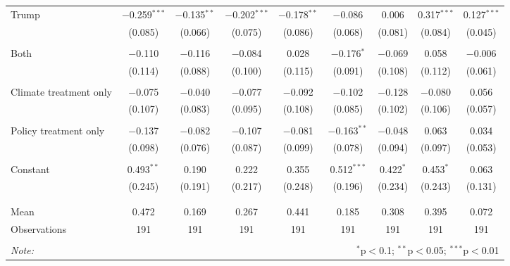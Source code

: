 \begin{tabular}{@{\extracolsep{5pt}}lcccccccc}
 Trump & $-$0.259$^{***}$ & $-$0.135$^{**}$ & $-$0.202$^{***}$ & $-$0.178$^{**}$ & $-$0.086 & 0.006 & 0.317$^{***}$ & 0.127$^{***}$ \\ 
  & (0.085) & (0.066) & (0.075) & (0.086) & (0.068) & (0.081) & (0.084) & (0.045) \\ 
  & & & & & & & & \\ 
 Both & $-$0.110 & $-$0.116 & $-$0.084 & 0.028 & $-$0.176$^{*}$ & $-$0.069 & 0.058 & $-$0.006 \\ 
  & (0.114) & (0.088) & (0.100) & (0.115) & (0.091) & (0.108) & (0.112) & (0.061) \\ 
  & & & & & & & & \\ 
 Climate treatment only & $-$0.075 & $-$0.040 & $-$0.077 & $-$0.092 & $-$0.102 & $-$0.128 & $-$0.080 & 0.056 \\ 
  & (0.107) & (0.083) & (0.095) & (0.108) & (0.085) & (0.102) & (0.106) & (0.057) \\ 
  & & & & & & & & \\ 
 Policy treatment only & $-$0.137 & $-$0.082 & $-$0.107 & $-$0.081 & $-$0.163$^{**}$ & $-$0.048 & 0.063 & 0.034 \\ 
  & (0.098) & (0.076) & (0.087) & (0.099) & (0.078) & (0.094) & (0.097) & (0.053) \\ 
  & & & & & & & & \\ 
 Constant & 0.493$^{**}$ & 0.190 & 0.222 & 0.355 & 0.512$^{***}$ & 0.422$^{*}$ & 0.453$^{*}$ & 0.063 \\ 
  & (0.245) & (0.191) & (0.217) & (0.248) & (0.196) & (0.234) & (0.243) & (0.131) \\ 
  & & & & & & & & \\ 
\hline \\[-1.8ex] 
Mean & 0.472 & 0.169 & 0.267 & 0.441 & 0.185 & 0.308 & 0.395 & 0.072 \\ 
Observations & 191 & 191 & 191 & 191 & 191 & 191 & 191 & 191 \\ 
\hline 
\hline \\[-1.8ex] 
\textit{Note:}  & \multicolumn{8}{r}{$^{*}$p$<$0.1; $^{**}$p$<$0.05; $^{***}$p$<$0.01} \\ 
\end{tabular} 
